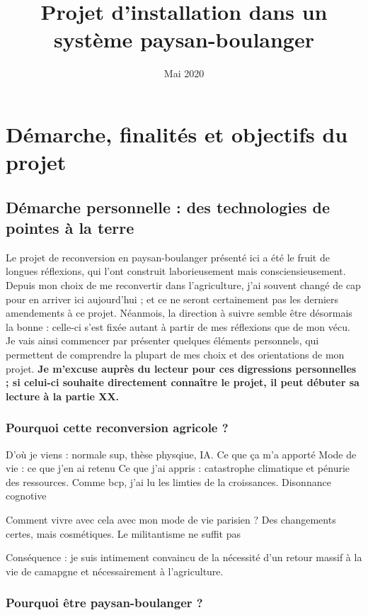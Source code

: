 \documentclass{book}
\title{Projet d'installation dans un système paysan-boulanger}
\date{Mai 2020}
\begin{document}
\maketitle

\chapter{Démarche, finalités et objectifs du projet}

\section{Démarche personnelle : des technologies de pointes à la terre}

Le projet de reconversion en paysan-boulanger présenté ici a été le fruit de longues réflexions, qui l'ont construit laborieusement mais consciensieusement. Depuis mon choix de me reconvertir dans l'agriculture, j'ai souvent changé de cap pour en arriver ici aujourd'hui ; et ce ne seront certainement pas les derniers amendements à ce projet. Néanmois, la direction à suivre semble être désormais la bonne : celle-ci s'est fixée autant à partir de mes réflexions que de mon vécu. Je vais ainsi commencer par présenter quelques éléments personnels, qui permettent de comprendre la plupart de mes choix et des orientations de mon projet.\textbf{ Je m'excuse auprès du lecteur pour ces digressions personnelles ; si celui-ci souhaite directement connaître le projet, il peut débuter sa lecture à la partie XX.}

\subsection{Pourquoi cette reconversion agricole ?}

D'où je viens : normale sup, thèse physqiue, IA. Ce que ça m'a apporté 
Mode de vie : ce que j'en ai retenu
Ce que j'ai appris : catastrophe climatique et pénurie des ressources. Comme bcp, j'ai lu les limties de la croissances.
Disonnance cognotive

Comment vivre avec cela avec mon mode de vie parisien ? Des changements certes, mais cosmétiques. Le militantisme ne suffit pas 

Conséquence : je suis intimement convaincu de la nécessité d'un retour massif à la vie de camapgne et nécessairement à l'agriculture. 

\subsection{Pourquoi être paysan-boulanger ?}
\end{document}
